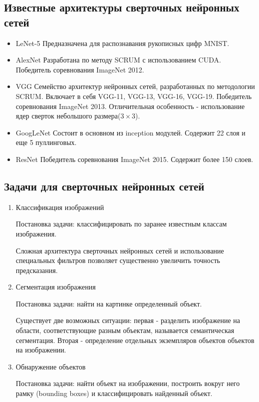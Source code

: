 {\subsection{Известные архитектуры сверточных нейронных сетей}
\begin{itemize}
\item LeNet-5 Предназначена для распознавания рукописных цифр MNIST.
\item AlexNet Разработана по методу SCRUM с использованием CUDA. Победитель соревнования ImageNet 2012.
\item VGG Семейство архитектур нейронных сетей, разработанных по методологии SCRUM. Включает в себя
VGG-11, VGG-13, VGG-16, VGG-19. Победитель соревнования ImageNet 2013. Отличительная особенность -
использование ядер сверток небольшого размера(\(3 \times 3\)).
\item GoogLeNet Состоит в основном из inception модулей. Содержит 22 слоя и еще 5 пуллинговых.
\item ResNet Победитель соревнования ImageNet 2015. Содержит более 150 слоев.
\end{itemize}

\subsection{Задачи для сверточных нейронных сетей}

\begin{enumerate}
\item Классификация изображений

Постановка задачи: классифицировать по заранее известным классам изображения.

Сложная архитектура сверточных нейронных сетей и использование специальных фильтров позволяет
существенно увеличить точность предсказания.

\item Сегментация изображения

Постановка задачи: найти на картинке определенный объект.

Существует две возможных ситуации: первая - разделить изображение на области, соответствующие
разным объектам, называется семантическая сегментация. Вторая - определение отдельных экземпляров
объектов объектов на изображении.

\item Обнаружение объектов

Постановка задачи: найти объект на изображении, построить вокруг него рамку (bounding boxes) и
классифицировать найденный объект.


\end{enumerate}}
